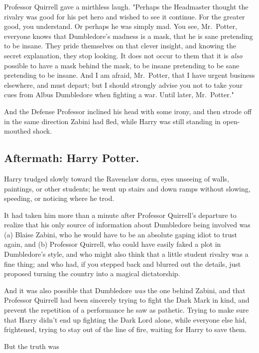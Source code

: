 Professor Quirrell gave a mirthless laugh. "Perhaps the Headmaster thought the
rivalry was good for his pet hero and wished to see it continue. For the
greater good, you understand. Or perhaps he was simply mad. You see,
Mr.~Potter, everyone knows that Dumbledore's madness is a mask, that he is sane
pretending to be insane. They pride themselves on that clever insight, and
knowing the secret explanation, they stop looking. It does not occur to them
that it is \emph{also} possible to have a mask behind the mask, to be insane
pretending to be sane pretending to be insane. And I am afraid, Mr.~Potter,
that I have urgent business elsewhere, and must depart; but I should strongly
advise you not to take your cues from Albus Dumbledore when fighting a war.
Until later, Mr.~Potter."

And the Defense Professor inclined his head with some irony, and then strode
off in the same direction Zabini had fled, while Harry was still standing in
open-mouthed shock.
\sbreak
\vspace{-2\baselineskip}
\subsection{Aftermath: Harry Potter.}

Harry trudged slowly toward the Ravenclaw dorm, eyes unseeing of walls,
paintings, or other students; he went up stairs and down ramps without slowing,
speeding, or noticing where he trod.

It had taken him more than a minute after Professor Quirrell's departure to
realize that his only source of information about Dumbledore being involved was
(a) Blaise Zabini, who he would have to be an absolute gaping idiot to trust
again, and (b) Professor Quirrell, who could have easily faked a plot in
Dumbledore's style, and who might also think that a little student rivalry was
a fine thing; and who had, if you stepped back and blurred out the details,
just proposed turning the country into a magical dictatorship.

And it was also possible that Dumbledore \emph{was} the one behind Zabini, and
that Professor Quirrell had been sincerely trying to fight the Dark Mark in
kind, and prevent the repetition of a performance he saw as pathetic. Trying to
make sure that Harry didn't end up fighting the Dark Lord alone, while everyone
else hid, frightened, trying to stay out of the line of fire, waiting for Harry
to save them.

But the truth was{\el}

